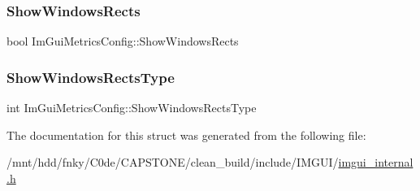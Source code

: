 \subsubsection{\texorpdfstring{Show\+Windows\+Rects}{ShowWindowsRects}}
{\footnotesize\ttfamily bool Im\+Gui\+Metrics\+Config\+::\+Show\+Windows\+Rects}

\mbox{\label{structImGuiMetricsConfig_a227d685106a6496fc3ddec60af5278e1}} 
\subsubsection{\texorpdfstring{Show\+Windows\+Rects\+Type}{ShowWindowsRectsType}}
{\footnotesize\ttfamily int Im\+Gui\+Metrics\+Config\+::\+Show\+Windows\+Rects\+Type}



The documentation for this struct was generated from the following file\+:\begin{DoxyCompactItemize}
\item 
/mnt/hdd/fnky/\+C0de/\+C\+A\+P\+S\+T\+O\+N\+E/clean\+\_\+build/include/\+I\+M\+G\+U\+I/\hyperlink{imgui__internal_8h}{imgui\+\_\+internal.\+h}\end{DoxyCompactItemize}
